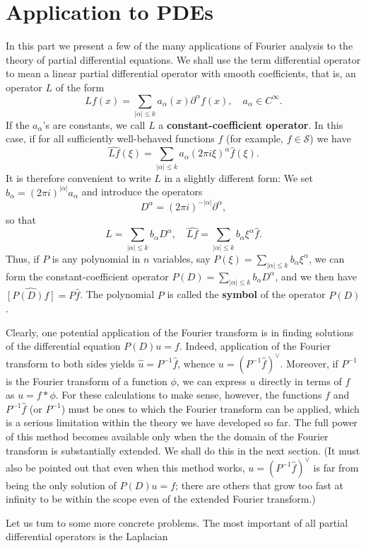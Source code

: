 \section{Application to PDEs}
In this part we present a few of the many applications of Fourier analysis to the theory of partial differential equations. We shall use the term differential operator to mean a linear partial differential operator with smooth coefficients, that is, an operator $L$ of the form
\[Lf(x)=\sum_{|\alpha|\leq k}a_\alpha(x)\partial^\alpha f(x),\quad a_\alpha\in C^\infty.\]
If the $a_\alpha$'s are constants, we call $L$ a \textbf{constant-coefficient operator}. In this case, if for all sufficiently well-behaved functions $f$ (for example, $f\in\mathscr{S}$) we have
\[\widehat{Lf}(\xi)=\sum_{|\alpha|\leq k}a_\alpha(2\pi i\xi)^\alpha\hat{f}(\xi).\]
It is therefore convenient to write $L$ in a slightly different form: We set $b_\alpha=(2\pi i)^{|\alpha|}a_\alpha$ and introduce the operators
\[D^\alpha=(2\pi i)^{-|\alpha|}\partial^\alpha,\]
so that
\[L=\sum_{|\alpha|\leq k}b_\alpha D^\alpha,\quad \widehat{Lf}=\sum_{|\alpha|\leq k}b_\alpha\xi^\alpha\hat{f}.\]
Thus, if $P$ is any polynomial in $n$ variables, say $P(\xi)=\sum_{|\alpha|\leq k}b_\alpha\xi^\alpha$, we can form the constant-coefficient operator $P(D)=\sum_{|\alpha|\leq k}b_\alpha D^\alpha$, and we then have $\widehat{[P(D)f]}=P\hat{f}$. The polynomial $P$ is called the \textbf{symbol} of the operator $P(D)$.\par
Clearly, one potential application of the Fourier transform is in finding solutions of the differential equation $P(D)u=f$. Indeed, application of the Fourier transform to both sides yields $\hat{u}=P^{-1}\hat{f}$, whence $u=(P^{-1}\hat{f})^{\vee}$. Moreover, if $P^{-1}$ is the Fourier transform of a function $\phi$, we can express $u$ directly in terms of $f$ as $u=f\ast\phi$. For these calculations to make sense, however, the functions $f$ and $P^{-1}\hat{f}$ (or $P^{-1}$) must be ones to which the Fourier transform can be applied, which is a serious limitation within the theory we have developed so far. The full power of this method becomes available only when the the domain of the Fourier transform is substantially extended. We shall do this in the next section. (It must also be pointed out that even when this method works, $u=(P^{-1}\hat{f})^{\vee}$ is far from being the only solution of $P(D)u=f$; there are others that grow too fast at infinity to be within the scope even of the extended Fourier transform.)\par
Let us tum to some more concrete problems. The most important of all partial differential operators is the Laplacian
